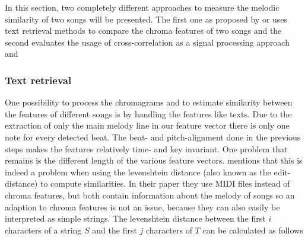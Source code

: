 In this section, two completely different approaches to measure the melodic similarity of two songs will be presented. The first one as proposed by \cite{chroma1} or \cite{chroma4} uses text retrieval methods to compare the chroma features of two songs and the second evaluates the usage of cross-correlation as a signal processing approach \cite{chroma2} and \cite{chroma3}

\subsubsection{Text retrieval}

One possibility to process the chromagrams and to estimate similarity between the features of different songs is by handling the features like texts. Due to the extraction of only the main melody line in our feature vector there is only one note for every detected beat. The beat- and pitch-alignment done in the previous steps makes the features relatively time- and key invariant. One problem that remains is the different length of the various feature vectors. \cite{chroma4} mentions that this is indeed a problem when using the levenshtein distance (also known as the edit-distance) to compute similarities. In their paper they use MIDI files instead of chroma features, but both contain information about the melody of songs so an adaption to chroma features is not an issue, because they can also easily be interpreted as simple strings. The levenshtein distance between the first $i$ characters of a string $S$ and the first $j$ characters of $T$ can be calculated as follows \cite[p. 7]{chroma4}

